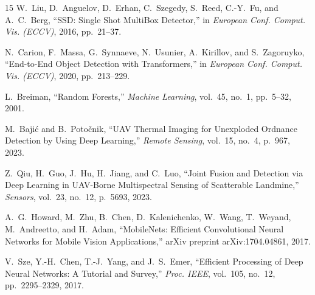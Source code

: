 \documentclass[conference]{IEEEtran}
\begin{document}
\begin{thebibliography}{15}
W.~Liu, D.~Anguelov, D.~Erhan, C.~Szegedy, S.~Reed, C.-Y.~Fu, and A.~C.~Berg, ``SSD: Single Shot MultiBox Detector,'' in \emph{European Conf. Comput. Vis. (ECCV)}, 2016, pp.~21--37.

N.~Carion, F.~Massa, G.~Synnaeve, N.~Usunier, A.~Kirillov, and S.~Zagoruyko, ``End-to-End Object Detection with Transformers,'' in \emph{European Conf. Comput. Vis. (ECCV)}, 2020, pp.~213--229.

L.~Breiman, ``Random Forests,'' \emph{Machine Learning}, vol.~45, no.~1, pp.~5--32, 2001.

M.~Baji\'{c} and B.~Poto\v{c}nik, ``UAV Thermal Imaging for Unexploded Ordnance Detection by Using Deep Learning,'' \emph{Remote Sensing}, vol.~15, no.~4, p.~967, 2023.

Z.~Qiu, H.~Guo, J.~Hu, H.~Jiang, and C.~Luo, ``Joint Fusion and Detection via Deep Learning in UAV-Borne Multispectral Sensing of Scatterable Landmine,'' \emph{Sensors}, vol.~23, no.~12, p.~5693, 2023.

A.~G.~Howard, M.~Zhu, B.~Chen, D.~Kalenichenko, W.~Wang, T.~Weyand, M.~Andreetto, and H.~Adam, ``MobileNets: Efficient Convolutional Neural Networks for Mobile Vision Applications,'' arXiv preprint arXiv:1704.04861, 2017.

V.~Sze, Y.-H.~Chen, T.-J.~Yang, and J.~S.~Emer, ``Efficient Processing of Deep Neural Networks: A Tutorial and Survey,'' \emph{Proc. IEEE}, vol.~105, no.~12, pp.~2295--2329, 2017.

\end{thebibliography}
\end{document}

